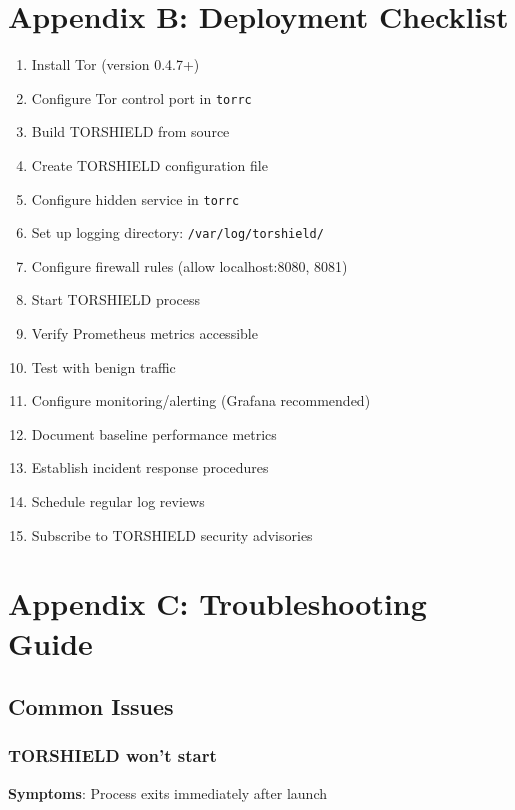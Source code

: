 \documentclass[11pt,a4paper]{article}
\begin{document}
\section{Appendix B: Deployment Checklist}

\begin{enumerate}
\item[$\square$] Install Tor (version 0.4.7+)
\item[$\square$] Configure Tor control port in \texttt{torrc}
\item[$\square$] Build TORSHIELD from source
\item[$\square$] Create TORSHIELD configuration file
\item[$\square$] Configure hidden service in \texttt{torrc}
\item[$\square$] Set up logging directory: \texttt{/var/log/torshield/}
\item[$\square$] Configure firewall rules (allow localhost:8080, 8081)
\item[$\square$] Start TORSHIELD process
\item[$\square$] Verify Prometheus metrics accessible
\item[$\square$] Test with benign traffic
\item[$\square$] Configure monitoring/alerting (Grafana recommended)
\item[$\square$] Document baseline performance metrics
\item[$\square$] Establish incident response procedures
\item[$\square$] Schedule regular log reviews
\item[$\square$] Subscribe to TORSHIELD security advisories
\end{enumerate}

\section{Appendix C: Troubleshooting Guide}

\subsection{Common Issues}

\subsubsection{TORSHIELD won't start}

\textbf{Symptoms}: Process exits immediately after launch
\end{document}
